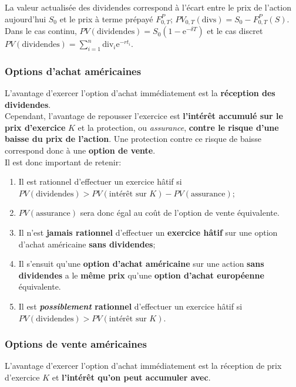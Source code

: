 \documentclass[10pt, french]{article}
\begin{document}
\begin{multicols*}{2}
La valeur actualisée des dividendes correspond à l'écart entre le prix de l'action aujourd'hui $S_{0}$ et le prix à terme prépayé $F_{0, T}^{P}$; $PV_{0, T}(\text{divs}) = S_{0} - F_{0, T}^{P}(S)$.\\

Dans le cas continu, $PV(\text{dividendes}) = S_{0} (1 - \textrm{e}^{-\delta T})$ et le cas discret $PV(\text{dividendes}) = \sum_{i = 1}^{n} \text{div}_{i} \textrm{e}^{-r t_{i}}$.

\subsubsection*{Options d'achat américaines}
L'avantage d'exercer l'option d'achat immédiatement est la \textbf{réception des dividendes}.\\

Cependant, l'avantage de repousser l'exercice est \textbf{l'intérêt accumulé sur le prix d'exercice} $K$ et la protection, ou \textit{assurance}, \textbf{contre le risque d'une baisse du prix de l'action}. Une protection contre ce risque de baisse correspond donc à une \textbf{option de vente}.\\

Il est donc important de retenir:
\begin{conceptgen}{}
\begin{enumerate}
	\item	Il est rationnel d'effectuer un exercice hâtif si\\
	 $PV(\text{dividendes}) > PV(\text{intérêt sur $K$}) - PV(\text{assurance})$;
 	\item[]	$PV(\text{assurance})$ sera donc égal au coût de l'option de vente équivalente.
	\item	Il n'est \textbf{jamais rationnel} d'effectuer un \textbf{exercice hâtif} sur une option d'achat américaine \textbf{sans dividendes};
	\item[]	Il s'ensuit qu'une \textbf{option d'achat américaine} sur une action \textbf{sans dividendes} a le \textbf{même prix} qu'une \textbf{option d'achat européenne} équivalente.
	\item	Il est \textbf{\textit{possiblement} rationnel} d'effectuer un exercice hâtif si \\
	$PV(\text{dividendes}) > PV(\text{intérêt sur $K$})$.
\end{enumerate}
\end{conceptgen}

\subsubsection*{Options de vente américaines}
L'avantage d'exercer l'option d'achat immédiatement est la réception de prix d'exercice $K$ et \textbf{l'intérêt qu'on peut accumuler avec}.\\


\end{multicols*}
\end{document}
